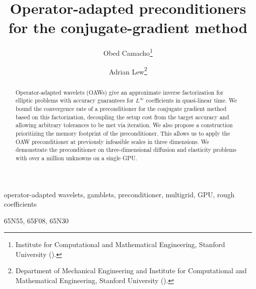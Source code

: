 \documentclass[hidelinks]{siamart}
\title{Operator-adapted preconditioners for the conjugate-gradient method}
\author{Obed Camacho\thanks{Institute for Computational and Mathematical
    Engineering, Stanford University (\email{obedc@stanford.edu}).}
  \and
  Adrian Lew\thanks{Department of Mechanical Engineering and Institute for
    Computational and Mathematical Engineering, Stanford University
    (\email{lewa@stanford.edu}).}}
\theoremstyle{nonumberplain}
\numberwithin{theorem}{section}
\begin{document}
\maketitle

\begin{abstract}
Operator-adapted wavelets (OAWs) give an approximate inverse factorization for elliptic problems with accuracy
guarantees for $L^\infty$ coefficients in quasi-linear time. We bound the convergence rate of a
preconditioner for the conjugate gradient method based on this factorization, decoupling the setup cost from the
target accuracy and allowing arbitrary tolerances to be met via iteration. We also propose
a construction prioritizing the memory footprint of the preconditioner. This allows us to apply the OAW preconditioner at previously infeasible scales in three dimensions. We demonstrate the preconditioner on three-dimensional diffusion
and elasticity problems with over a million unknowns on a single GPU.
\end{abstract}

\begin{keywords}
  operator-adapted wavelets, gamblets, preconditioner, multigrid, GPU,
  rough coefficients
\end{keywords}

\begin{AMS}
  65N55, 65F08, 65N30
\end{AMS}

\end{document}
